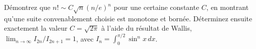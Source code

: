 \begin{question}\label{iq:iv1:calculus-and-optimisation:20}
Démontrez que $n! \sim C\sqrt{n}(n/e)^n$ pour une certaine constante $C$, en montrant qu'une suite convenablement choisie est monotone et bornée. Déterminez ensuite exactement la valeur $C = \sqrt{2\pi}$ à l'aide du résultat de Wallis, $\lim_{n \to \infty} I_{2n}/I_{2n + 1} = 1$, avec $I_n = \int_0^{\pi/2} \sin^n x\,dx$.
\end{question}
